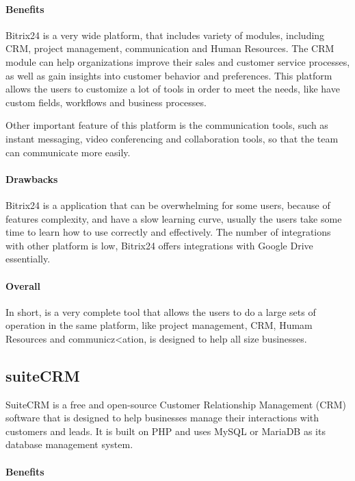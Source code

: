 \documentclass{article}
\begin{document}
\paragraph{Benefits}

Bitrix24 is a very wide platform, that includes variety of modules, including CRM, project management, communication and Human Resources. The CRM module can help organizations improve their sales and customer service processes, as well as gain insights into customer behavior and preferences. This platform allows the users to customize a lot of tools in order to meet the needs, like have custom fields, workflows and business processes.

Other important feature of this platform is the communication tools, such as instant messaging, video conferencing and collaboration tools, so that the team can communicate more easily.

\paragraph{Drawbacks}

Bitrix24 is a application that can be overwhelming for some users, because of features complexity, and have a slow learning curve, usually the users take some time to learn how to use correctly and effectively.
The number of integrations with other platform is low, Bitrix24 offers integrations with Google Drive essentially.

\paragraph{Overall}

In short, is a very complete tool that allows the users to do a large sets of operation in the same platform, like project management, CRM, Humam Resources and communicz<ation, is designed to help all size businesses.

\subsection{suiteCRM}

SuiteCRM is a free and open-source Customer Relationship Management (CRM) software that is designed to help businesses manage their interactions with customers and leads. It is built on PHP and uses MySQL or MariaDB as its database management system.

\paragraph{Benefits}
\end{document}
